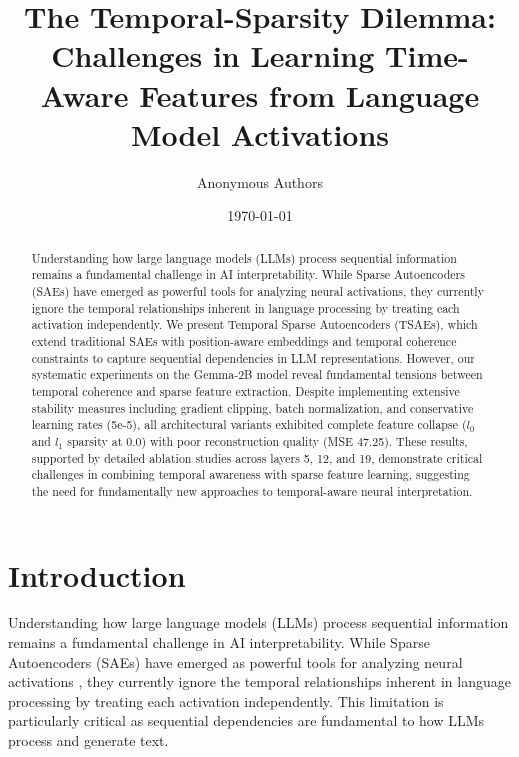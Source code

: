 \title{The Temporal-Sparsity Dilemma: Challenges in Learning Time-Aware Features from Language Model Activations}

\author{Anonymous Authors}
\date{\today}


\maketitle

\begin{abstract}
Understanding how large language models (LLMs) process sequential information remains a fundamental challenge in AI interpretability. While Sparse Autoencoders (SAEs) have emerged as powerful tools for analyzing neural activations, they currently ignore the temporal relationships inherent in language processing by treating each activation independently. We present Temporal Sparse Autoencoders (TSAEs), which extend traditional SAEs with position-aware embeddings and temporal coherence constraints to capture sequential dependencies in LLM representations. However, our systematic experiments on the Gemma-2B model reveal fundamental tensions between temporal coherence and sparse feature extraction. Despite implementing extensive stability measures including gradient clipping, batch normalization, and conservative learning rates (5e-5), all architectural variants exhibited complete feature collapse ($l_0$ and $l_1$ sparsity at 0.0) with poor reconstruction quality (MSE 47.25). These results, supported by detailed ablation studies across layers 5, 12, and 19, demonstrate critical challenges in combining temporal awareness with sparse feature learning, suggesting the need for fundamentally new approaches to temporal-aware neural interpretation.
\end{abstract}

\section{Introduction}
Understanding how large language models (LLMs) process sequential information remains a fundamental challenge in AI interpretability. While Sparse Autoencoders (SAEs) have emerged as powerful tools for analyzing neural activations \cite{anthropic2022decomposition}, they currently ignore the temporal relationships inherent in language processing by treating each activation independently. This limitation is particularly critical as sequential dependencies are fundamental to how LLMs process and generate text.


